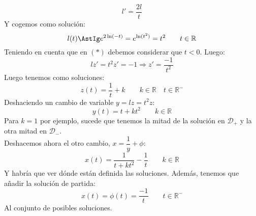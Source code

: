 \begin{ejemplo}
\begin{equation*}
        l' = \dfrac{2l}{t}
    \end{equation*}
    Y cogemos como solución:
    \begin{equation*}
        l(t) \AstIg e^{2\ln(-t)} = e^{\ln(t^2)} = t^2 \qquad t\in \mathbb{R}
    \end{equation*}
    Teniendo en cuenta que en $(\ast)$ debemos considerar que $t<0$. Luego:
    \begin{equation*}
        lz' = t^2 z' = -1 \Longrightarrow z' = \dfrac{-1}{t^2}
    \end{equation*}
    Luego tenemos como soluciones:
    \begin{equation*}
        z(t) = \dfrac{1}{t} + k \qquad k\in \mathbb{R} \quad t\in \mathbb{R}^-
    \end{equation*}
    Deshaciendo un cambio de variable $y=lz = t^2 z$:
    \begin{equation*}
        y(t) = t + kt^2 \qquad k\in \mathbb{R} 
    \end{equation*}
    Para $k=1$ por ejemplo, sucede que tenemos la mitad de la solución en $\mathcal{D}_+$ y la otra mitad en $\mathcal{D}_-$.\\
    Deshacemos ahora el otro cambio, $x=\dfrac{1}{y}+\phi$:
    \begin{equation*}
        x(t) = \dfrac{1}{t+kt^2} - \dfrac{1}{t} \qquad k\in \mathbb{R}
    \end{equation*}
    Y habría que ver dónde están definida las soluciones. Además, tenemos que añadir la solución de partida:
    \begin{equation*}
        x(t) = \phi(t) = \dfrac{-1}{t}\qquad t\in \mathbb{R}^-
    \end{equation*}
    Al conjunto de posibles soluciones.
\end{ejemplo}


